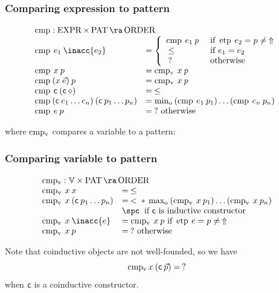 \subsubsection{Comparing expression to pattern}
\[
\begin{array}[t]{ll}
\multicolumn{2}{l}{\cmp : \Expr \times \Pat \ra \order}\\ 
\cmp \: e_1 \: \inacc{e_2} & = \left\{ 
\begin{array}{ll}
\cmp \: e_1 \: p & \mbox{ if } \etp \: e_2 = p \neq \: \stuck \\
\: \leq \: & \mbox{ if } e_1 = e_2 \\
\: ? \:    & \mbox{ otherwise}
\end{array}\right.\\ 
\cmp \: x \: p & = \cmpv \: x \:p  \\
\cmp \: (x \: \vec{e}) \: p & = \cmpv \: x \:p  \\
\cmp \: \cc   \: (\cc \: \diamond) & = \: \leq \\
\cmp \: (\cc \: e_1 \ldots e_n) \: (\cc \: p_1 \ldots p_n) & = \info \: (\cmp \: e_1 \: p_1) \ldots (\cmp \: e_n \: p_n)\\

\cmp \: e \: p & = \: ? \mbox{ otherwise}
\end{array}
\]

where $\operatorname{cmp_v}$ compares a variable to a pattern:

\subsubsection{Comparing variable to pattern}
\[
\begin{array}[t]{ll}
\multicolumn{2}{l}{\cmpv : \cV \times \Pat \ra \order}\\ 
\cmpv \: x \: x & = \: \leq \\
\cmpv \: x \: (\cc \: p_1 \ldots p_n) & = \: < \: * \: \supo \: (\cmpv \: x \: p_1) \ldots (\cmpv \: x \: p_n) \\
& \spc \: \mbox{ if } \cc \mbox{ is inductive constructor}\\
\cmpv \: x \: \inacc{e} & = \cmpv \: x \: p \mbox{ if } \etp \: e = p \neq \: \stuck \\
\cmpv \: x \: p & = \: ? \mbox{ otherwise}
\end{array}
\]


\noindent Note that coinductive objects are not well-founded, so we have 
\[\operatorname{cmp_v} x \: (\mathsf{c} \: \vec{p}) = \: ? \]
when $\mathsf{c}$ is a coinductive constructor. 

